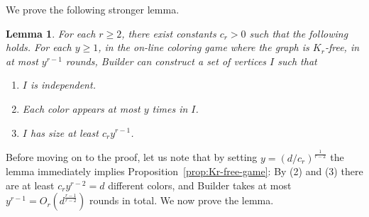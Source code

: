 \documentclass[10pt]{amsart}
\newtheorem{lemma}[theorem]{Lemma}
\theoremstyle{definition}
\begin{document}
We prove the following stronger lemma.
\begin{lemma}
For each $r \geq 2$, there exist constants $c_r > 0$ such that the following holds. For each $y \geq 1$, in the on-line coloring game where the graph is $K_r$-free, in at most $y^{r-1}$ rounds, Builder can construct a set of vertices $I$ such that
\begin{enumerate}
    \item $I$ is independent.
    \item Each color appears at most $y$ times in $I$.
    \item $I$ has size at least $c_r y^{r - 1}$.
\end{enumerate}
\end{lemma}
Before moving on to the proof, let us note that by setting $y = (d / c_r)^{\frac{1}{r - 2}}$ the lemma immediately implies Proposition~\ref{prop:Kr-free-game}: By (2) and (3) there are at least $c_r y^{r - 2} = d$ different colors, and Builder takes at most $y^{r - 1} = O_r(d^{\frac{r - 1}{r - 2}})$ rounds in total. We now prove the lemma.
\end{document}
